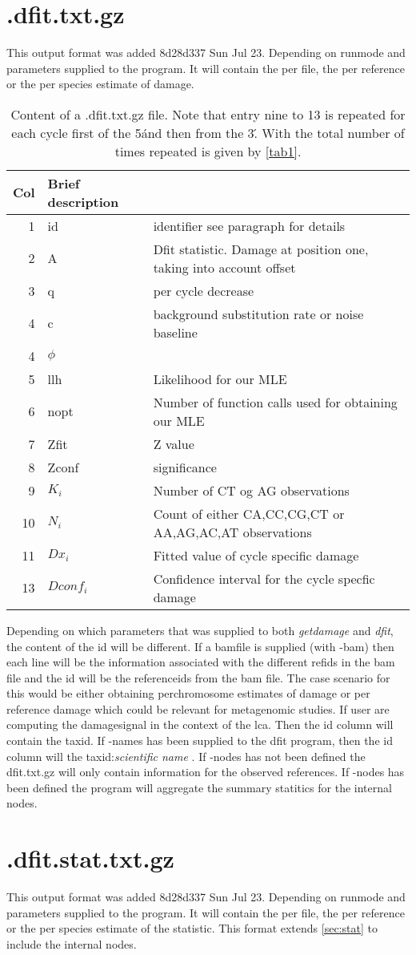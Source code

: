 \documentclass[10pt]{article}
\begin{document}
\section{.dfit.txt.gz}
This output format was added 8d28d337 Sun Jul 23.  Depending on
runmode and parameters supplied to the program. It will contain the
per file, the per reference or the per species estimate of damage.

\begin{table}[h]
\begin{tabular}{rll}
  \hline
  {\bf Col} & {\bf Brief description} \\
  \hline
  1 & {\sf id} & identifier see paragraph for details\\
  2 & {\sf A} & Dfit statistic. Damage at position one, taking into account offset\\
  3 & {\sf q} & per cycle decrease\\
  4 & {\sf c} & background substitution rate or noise baseline\\ 
  4 & {\sf $\phi$} & \\
  5 & {\sf llh} & Likelihood for our MLE\\
  6 & {\sf nopt} & Number of function calls used for obtaining our MLE\\
  7 & {\sf Zfit} & Z value\\
  8 & {\sf Zconf} & significance\\\hline\hline
  9 & {\sf $K_i$} & Number of CT og AG observations\\
  10 & {\sf $N_i$} & Count of either CA,CC,CG,CT or AA,AG,AC,AT observations\\
  11 & {\sf $Dx_i$} & Fitted value of cycle specific damage\\
  13 &{\sf $Dconf_i$ }& Confidence interval for the cycle specfic damage\\\hline\hline     
\end{tabular}\label{tab3}
\caption{Content of a .dfit.txt.gz file. Note that entry nine to 13 is
  repeated for each cycle first of the 5\' and then from the 3\'. With
  the total number of times repeated is given by \ref{tab1}.} 
\end{table}
Depending on which parameters that was supplied to both
\emph{getdamage} and \emph{dfit}, the content of the id will be
different. If a bamfile is supplied (with -bam) then each line will be
the information associated with the different refids in the bam file
and the id will be the referenceids from the bam file. The case
scenario for this would be either obtaining perchromosome estimates of
damage or per reference damage which could be relevant for metagenomic
studies. If user are computing the damagesignal in the context of the
lca. Then the id column will contain the taxid. If -names has been
supplied to the dfit program, then the id column will the
taxid:\emph{scientific name} . If -nodes has not been defined the
dfit.txt.gz will only contain information for the observed
references. If -nodes has been defined the program will aggregate the
summary statitics for the internal nodes.

\section{.dfit.stat.txt.gz}
This output format was added 8d28d337 Sun Jul 23.  Depending on
runmode and parameters supplied to the program. It will contain the
per file, the per reference or the per species estimate of the
statistic. This format extends \ref{sec:stat} to include the internal
nodes.
\end{document}
